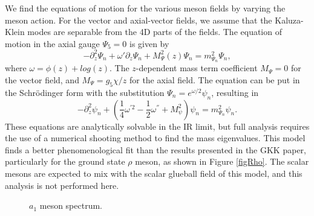 \documentclass[12pt]{article}
\newcommand{\be}{\begin{equation}}
\newcommand{\ee}{\end{equation}}
\def\thalf{{\textstyle{\frac{1}{2}}}}
\def\oneqt{{\textstyle{\frac{1}{4}}}}
\begin{document}
We find the equations of motion for the various meson fields by varying the meson action.
For the vector and axial-vector fields, we  assume that the Kaluza-Klein modes are separable from the 4D parts of the fields.
The equation of motion in the axial gauge $\Psi_5=0$  is given by
\be
-\partial_z^2\Psi_n+\omega'\partial_z\Psi_n +M_\Psi^2(z) \Psi_n=m^2_{\Psi_n}\Psi_n,
\ee
where $\omega=\phi(z)+log(z)$. 
The $z$-dependent mass term coefficient $M_\Psi=0$  for the vector field, and $M_\Psi=g_5\chi/z$ for the axial field.
The equation can be put in the Schr{\"o}dinger form with the substitution $\Psi_n=e^{\omega/2}\psi_n$, resulting in
\be
-\partial^2_z\psi_n+\left(\oneqt \omega^{'2}-\thalf\omega^{''}+M_\psi^2\right)\psi_n=m^2_{\Psi_n}\psi_n.
\ee
These equations are analytically solvable in the IR limit, but full analysis requires the use of a numerical shooting method to find the mass eigenvalues.
This model finds a better phenomenological fit than the results presented in the GKK paper, particularly for the ground state $\rho$ meson, as shown in Figure \ref{figRho}. 
The scalar mesons are expected to mix with the scalar glueball field of this model, and this analysis is not performed here. 

\begin{figure}[htb]
\caption{$a_1$ meson spectrum.}
\end{figure}
\end{document}
